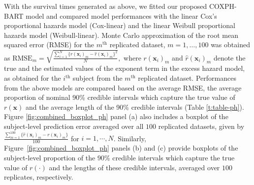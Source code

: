 \documentclass[12pt]{article}
\begin{document}
With the survival times generated as above, we fitted our proposed COXPH-BART model and compared model performances with the linear Cox's proportional hazards model (Cox-linear) and the linear Weibull proportional hazards model (Weibull-linear). Monte Carlo approximation of the root mean squared error (RMSE) for the $m^{\text{th}}$ replicated dataset, $m=1,\dots,100$ was obtained as $\text{RMSE}_m = \sqrt{\frac{\sum_{i=1}^{N}\{ r(\mathbf{x}_{i})_m - \widehat{r}(\mathbf{x}_{i})_m\}^2}{N}},$ where $r(\mathbf{x}_{i})_m$ and $\widehat{r}(\mathbf{x}_{i})_m$ denote the true and the estimated values of the exponent term in the excess hazard model, as obtained for the $i^{\text{th}}$ subject from the $m^{\text{th}}$ replicated dataset. Performances from the above models are compared based on the average RMSE, the average proportion of nominal 90\% credible intervals which capture the true value of $r(\mathbf{x})$ and the average length of the 90\% credible intervals (Table \ref{t:table-ph}). 
Figure \ref{fig:combined_boxplot_ph} panel (a) also includes a boxplot of the subject-level prediction error averaged over all $100$ replicated datasets, given by $\frac{\sum_{m=1}^{100}\{\widehat r(\mathbf{x}_i)_m - r(\mathbf{x}_i)_m\}}{100}$ for $i=1, \cdots, N$. Similarly, Figure~\ref{fig:combined_boxplot_ph} panels (b) and (c) provide boxplots of the subject-level proportion of the $90\%$ credible intervals which capture the true value of $r(\cdot)$ and the lengths of these credible intervals, averaged over $100$ replicates, respectively. 
\end{document}

